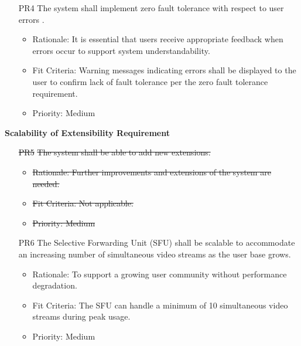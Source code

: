 \documentclass[12pt]{article}
\begin{document}
\begin{itemize}
    \item[PR4] The system shall implement zero fault tolerance with respect to user errors
    . \label{PR4}
    \begin{itemize}
        \item Rationale: It is essential that users receive appropriate feedback when errors occur to support system understandability.
        \item Fit Criteria: Warning messages indicating errors shall be displayed to the user to confirm lack of fault tolerance per the zero fault tolerance requirement.
        \item Priority: Medium
    \end{itemize}
\end{itemize}
\textbf{Scalability of Extensibility Requirement}
\begin{itemize}
    \item[\sout{PR5}] \sout{The system shall be able to add new extensions.} \label{PR5}
    \begin{itemize}
        \item \sout{Rationale: Further improvements and extensions of the system are needed.}
        \item \sout{Fit Criteria: Not applicable.}
        \item \sout{Priority: Medium}
    \end{itemize}
\end{itemize}
\begin{itemize}
    \item[PR6] The Selective Forwarding Unit (SFU) shall be scalable to accommodate an increasing number of simultaneous video streams as the user base grows. \label{PR6}
    \begin{itemize}
        \item Rationale: To support a growing user community without performance degradation.
        \item Fit Criteria: The SFU can handle a minimum of 10 simultaneous video streams during peak usage.
        \item Priority: Medium
    \end{itemize}
\end{itemize}
\end{document}
